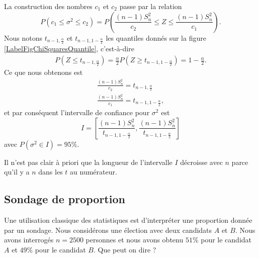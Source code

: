 \begin{example}
	La construction des nombres \( c_1\) et \( c_2\) passe par la relation
	\begin{equation}
		P(c_1\leq \sigma^2\leq c_2)=P\left( \frac{ (n-1)S_n^2 }{ c_2 }\leq Z\leq\frac{ (n-1)S_n^2 }{ c_1 } \right).
	\end{equation}
	Nous notons \( t_{n-1,\frac{ \alpha }{2}}\) et \( t_{n-1,1-\frac{ \alpha }{2}}\) les quantiles donnés sur la figure \ref{LabelFigChiSquaresQuantile}, c'est-à-dire
	\begin{subequations}
		\begin{align}
			P(Z\leq t_{n-1,\frac{ \alpha }{2}})=\frac{ \alpha }{2}
			P(Z\geq t_{n-1,1-\frac{ \alpha }{2}})=1-\frac{ \alpha }{2}.
		\end{align}
	\end{subequations}
	Ce que nous obtenons est
	\begin{subequations}
		\begin{align}
			\frac{ (n-1)S_n^2 }{ c_2 }=t_{n-1,\frac{ \alpha }{2}} \\
			\frac{ (n-1)S_n^2 }{ c_1 }=t_{n-1,1-\frac{ \alpha }{2}},
		\end{align}
	\end{subequations}
	et par conséquent l'intervalle de confiance pour \( \sigma^2\) est
	\begin{equation}
		I=\left[ \frac{ (n-1)S_n^2 }{ t_{n-1,1-\frac{ \alpha }{2}} },\frac{ (n-1)S_n^2 }{ t_{n-1,1-\frac{ \alpha }{2}} } \right]
	\end{equation}
	avec \( P(\sigma^2\in I)=95\%\).

	\begin{remark}
		Il n'est pas clair à priori que la longueur de l'intervalle \( I\) décroisse avec \( n\) parce qu'il y a \( n\) dans les \( t\) au numérateur.
	\end{remark}

\end{example}

\subsection{Sondage de proportion}

Une utilisation classique des statistiques est d'interpréter une proportion donnée par un sondage. Nous considérons une élection avec deux candidats \( A\) et \( B\). Nous avons interrogés \( n=2500\) personnes et nous avons obtenu \( 51\%\) pour le candidat \( A\) et \( 49\%\) pour le candidat \( B\). Que peut on dire ?

